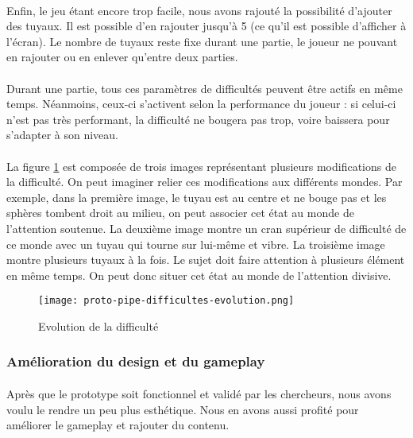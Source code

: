 \paragraph{}Enfin, le jeu étant encore trop facile, nous avons rajouté la possibilité d'ajouter des tuyaux. Il est possible d'en rajouter jusqu'à 5 (ce qu'il est possible d'afficher à l'écran). Le
nombre de tuyaux reste fixe durant une partie, le joueur ne pouvant en rajouter ou en enlever qu'entre deux parties.

\paragraph{}Durant une partie, tous ces paramètres de difficultés peuvent être actifs en même temps. Néanmoins, ceux-ci s'activent selon la performance du joueur : si celui-ci n'est pas très
performant, la difficulté ne bougera pas trop, voire baissera pour s'adapter à son niveau.

\paragraph{}La figure \ref{ProtoPipeDifficultes} est composée de trois images représentant plusieurs modifications de la difficulté. On peut imaginer relier ces modifications aux
différents mondes. Par exemple, dans la première image, le tuyau est au centre et ne bouge pas et les sphères tombent droit au milieu, on peut associer cet état au monde de l'attention
soutenue. La deuxième image montre un cran supérieur de difficulté de ce monde avec un tuyau qui tourne sur lui-même et vibre. La troisième image montre plusieurs tuyaux à la fois.
Le sujet doit faire attention à plusieurs élément en même temps. On peut donc situer cet état au monde de l'attention divisive.

\begin{figure}[H]
    \begin{center}
    \texttt{[image: proto-pipe-difficultes-evolution.png]}
    \end{center}
    \caption{Evolution de la difficulté}
\label{ProtoPipeDifficultes}
\end{figure}

\newpage
\subsubsection{Amélioration du design et du gameplay}

\paragraph{}Après que le prototype soit fonctionnel et validé par les chercheurs, nous avons voulu le rendre un peu plus esthétique. Nous en avons aussi profité pour améliorer le
gameplay et rajouter du contenu. \\


